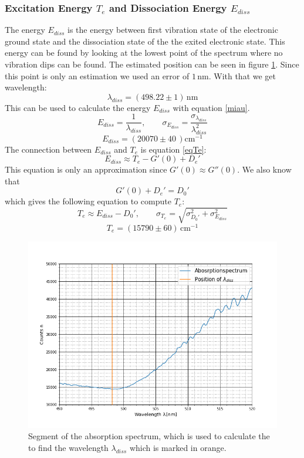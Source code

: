 \subsubsection{Excitation Energy $T_e$ and Dissociation Energy $E_{diss}$}
The energy $E_{diss}$ is the energy between first vibration state of the electronic ground state and the dissociation state of the the exited electronic state. This energy can be found by looking at the lowest point of the spectrum where no vibration dips can be found. The estimated position can be seen in figure \ref{figAS4}.
Since this point is only an estimation we used an error of $1\,$nm. With that we get wavelength: $$\lambda_{diss}=(498.22\pm 1)\,\text{nm}$$
This can be used to calculate the energy $E_{diss}$ with equation \ref{miau}.
\begin{equation}
	E_{diss}=\frac{1}{\lambda_{diss}}, \qquad \sigma_{E_{diss}}=\frac{\sigma_{\lambda_{diss}}}{\lambda_{diss}^2}
	\label{miau}
\end{equation}
$$E_{diss}=(20070\pm 40\,)\text{cm}^{-1}$$
The connection between $E_{diss}$ and $T_e$ is equation \ref{eqTe}:
\begin{equation}
	E_{diss}\approx T_e-G'(0)+D_e'
	\label{eqTe}
\end{equation}
This equation is only an approximation since $G'(0)\approx G''(0)$. We also know that $$G'(0)+D_e'=D_0'$$ which gives the following equation to compute $T_e$:
\begin{equation}
	T_e \approx E_{diss} - D_0', \qquad \sigma_{T_e}=\sqrt{\sigma_{D_0'}^2+\sigma_{E_{diss}}^2}
\end{equation}
$$T_e=(15790\pm 60)\,\text{cm}^{-1}$$
\begin{figure}[ht]
	\includegraphics[scale=0.5]{Bild/AS_4.png}
	\centering
	\caption[Segment of the Absorption Spectrum]{\small Segment of the absorption spectrum, which is used to calculate the to find the wavelength $\lambda_{diss}$ which is marked in orange.}
	\label{figAS4}
\end{figure}
